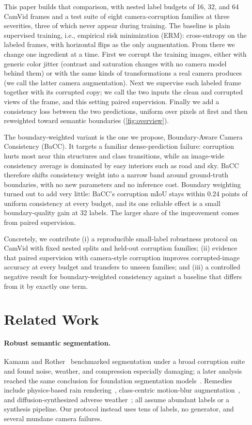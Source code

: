 \documentclass[runningheads]{llncs}
\newcommand{\method}{BaCC}
\begin{document}
This paper builds that comparison, with nested label budgets of 16, 32, and 64
CamVid frames and a test suite of eight camera-corruption families at three
severities, three of which never appear during training. The baseline is
plain supervised training, i.e., empirical risk minimization (ERM):
cross-entropy on the labeled frames, with horizontal flips as the only
augmentation. From there we change one ingredient at a time. First we corrupt
the training images, either with generic color jitter (contrast and saturation
changes with no camera model behind them) or with the same kinds of
transformations a real camera produces (we call the latter camera
augmentation). Next we supervise each labeled frame together with its
corrupted copy; we call the two inputs the clean and corrupted views of the
frame, and this setting paired supervision. Finally we add a consistency loss
between the two predictions, uniform over pixels at first and then reweighted
toward semantic boundaries (\cref{fig:overview}).

The boundary-weighted variant is the one we propose, Boundary-Aware Camera
Consistency (\method{}). It targets a familiar dense-prediction failure:
corruption hurts most near thin structures and class transitions, while an
image-wide consistency average is dominated by easy interiors such as road and
sky. \method{} therefore shifts consistency weight into a narrow band around
ground-truth boundaries, with no new parameters and no inference cost. Boundary weighting
turned out to add very little: \method{}'s corruption mIoU stays within 0.24
points of uniform consistency at every budget, and its one reliable effect is a small
boundary-quality gain at 32 labels. The larger share of the improvement comes
from paired supervision.

Concretely, we contribute (i) a reproducible small-label robustness protocol
on CamVid with fixed nested splits and held-out corruption families;
(ii) evidence that paired supervision with camera-style corruption improves
corrupted-image accuracy at every budget and transfers to unseen families; and
(iii) a controlled negative result for boundary-weighted consistency against a
baseline that differs from it by exactly one term.

\section{Related Work}

\paragraph{Robust semantic segmentation.}
Kamann and Rother~\cite{kamann2020benchmarking} benchmarked segmentation under
a broad corruption suite and found noise, weather, and compression especially
damaging; a later analysis reached the same conclusion for foundation
segmentation models~\cite{schiappa2024robustness}. Remedies include
physics-based rain rendering~\cite{halder2019rain}, class-centric motion-blur
augmentation~\cite{aakanksha2023motionblur}, and diffusion-synthesized adverse
weather~\cite{rubab2026safedrive}; all assume abundant labels or a synthesis
pipeline. Our protocol instead uses tens of labels, no generator, and several
mundane camera failures.
\end{document}
